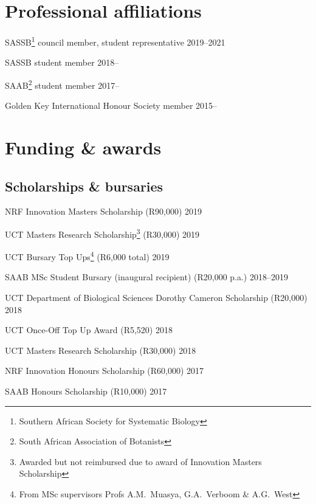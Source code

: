 \documentclass[10pt]{article}
\begin{document}
\section*{Professional affiliations} %

SASSB\footnote{Southern African Society for Systematic Biology}
  council member, student representative                       \hfill 2019--2021

SASSB student member                                               \hfill 2018--

SAAB\footnote{South African Association of Botanists}
  student member                                                   \hfill 2017--

Golden Key International Honour Society member                     \hfill 2015--

\section*{Funding \& awards} %

\subsection*{Scholarships \& bursaries}

NRF Innovation Masters Scholarship (R90,000)                         \hfill 2019

UCT Masters Research Scholarship\footnote{Awarded but not reimbursed
  due to award of Innovation Masters Scholarship} (R30,000)          \hfill 2019

UCT Bursary Top Ups\footnote{From MSc supervisors Profs A.M.~Muasya,
  G.A.~Verboom \& A.G.~West} (R6,000 total)                          \hfill 2019

SAAB MSc Student Bursary (inaugural recipient) (R20,000 p.a.)  \hfill 2018--2019

UCT Department of Biological Sciences Dorothy Cameron Scholarship
  (R20,000)                                                          \hfill 2018

UCT Once-Off Top Up Award (R5,520)                                   \hfill 2018

UCT Masters Research Scholarship (R30,000)                           \hfill 2018

NRF Innovation Honours Scholarship (R60,000)                         \hfill 2017

SAAB Honours Scholarship (R10,000)                                   \hfill 2017
\end{document}
